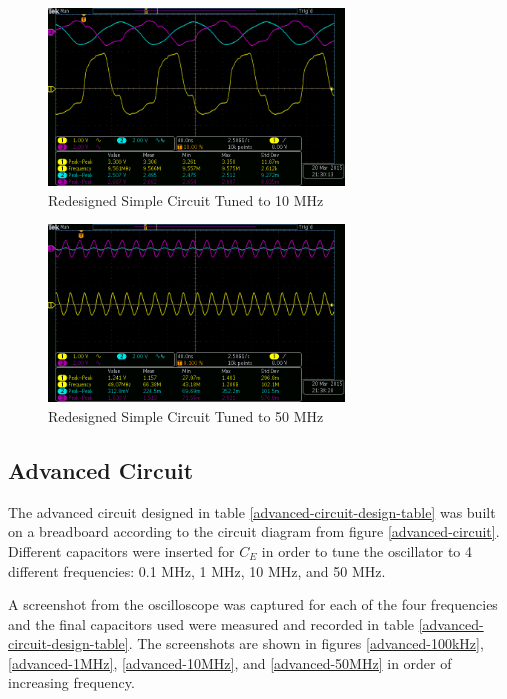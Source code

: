 \documentclass[titlepage, letterpaper, 10.5pt]{article}
\begin{document}
\begin{figure}[ht]
	\centering
	\includegraphics[width=0.7\textwidth]{results/simple-10MHz}
	\caption{Redesigned Simple Circuit Tuned to 10 MHz}
	\label{simple-10MHz}
\end{figure}

\begin{figure}[ht]
	\centering
	\includegraphics[width=0.7\textwidth]{results/simple-50MHz}
	\caption{Redesigned Simple Circuit Tuned to 50 MHz}
	\label{simple-50MHz}
\end{figure}

\clearpage
\subsection{Advanced Circuit}

The advanced circuit designed in table \ref{advanced-circuit-design-table}
was built on a breadboard according to the circuit diagram from figure
\ref{advanced-circuit}. Different capacitors were inserted for $C_{E}$
in order to tune the oscillator to 4 different frequencies: 0.1 MHz, 1 MHz, 10 MHz, and 50 MHz.

A screenshot from the oscilloscope was captured for each of the four frequencies and the final
capacitors used were measured and recorded in table
\ref{advanced-circuit-design-table}. The screenshots are shown in figures \ref{advanced-100kHz},
\ref{advanced-1MHz}, \ref{advanced-10MHz}, and \ref{advanced-50MHz} in order of increasing frequency.
\end{document}
